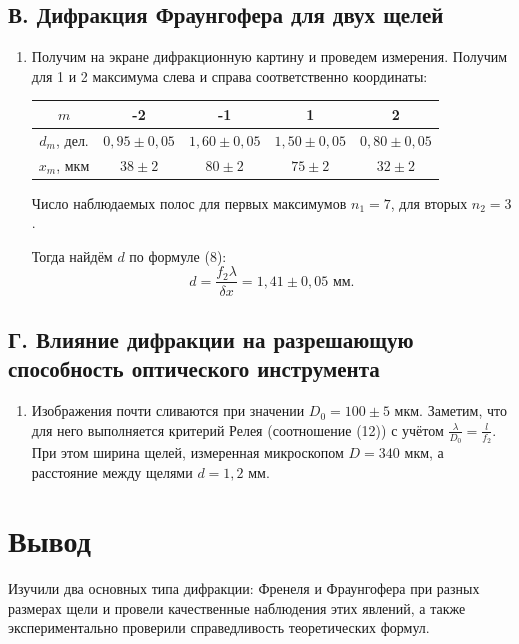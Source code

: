 \documentclass[a4paper,12pt]{article}
\begin{document}
\subsection*{В. Дифракция Фраунгофера для двух щелей}
\begin{enumerate}
	\item Получим на экране дифракционную картину и проведем измерения. Получим для 1 и 2 максимума слева и справа соответственно координаты:
\begin{center}
\begin{tabular}{|c|c|c|c|c|}
	\hline
	$m$ & -2 & -1 & 1 & 2 \\ \hline
	$d_m$, дел. & $0{,}95\pm0{,}05$ & $1{,}60\pm0{,}05$ & $1{,}50\pm0{,}05$ & $0{,}80\pm0{,}05$ \\ \hline
	$x_m$, мкм & $38\pm2$ & $80\pm2$ & $75\pm2$ & $32\pm2$ \\ \hline
\end{tabular}
\end{center}
	Число наблюдаемых полос для первых максимумов $n_1 = 7$, для вторых $n_2 = 3$.
	
	Тогда найдём $d$ по формуле (8):
	\begin{equation*}
	d = \dfrac{f_2\lambda}{\delta x} = 1{,}41\pm0{,}05\text{ мм}.
	\end{equation*}

\end{enumerate}
	\subsection*{Г. Влияние дифракции на разрешающую способность оптического инструмента}
\begin{enumerate}
	\item Изображения почти сливаются при значении $D_0 = 100 \pm5 \text{ мкм}$. Заметим, что для него выполняется критерий Релея (соотношение (12)) с учётом $\frac{\lambda}{D_0} = \frac{l}{f_2}$. При этом ширина щелей, измеренная микроскопом $D = 340$ мкм, а расстояние между щелями $d = 1{,}2$ мм.
\end{enumerate}

\section*{Вывод}

Изучили два основных типа дифракции: Френеля и Фраунгофера при разных размерах щели и провели качественные наблюдения этих явлений, а также экспериментально проверили справедливость теоретических формул.  
\end{document}

